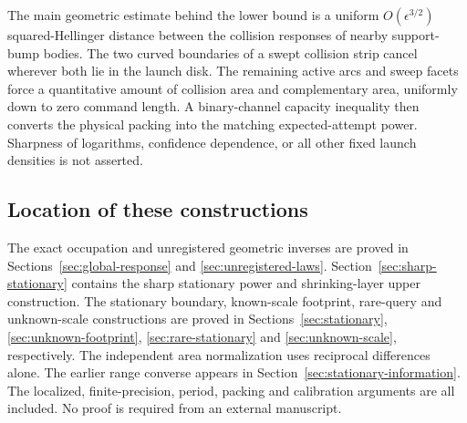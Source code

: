 The main geometric estimate behind the lower bound is a uniform
$O(\epsilon^{3/2})$ squared-Hellinger distance between the collision
responses of nearby support-bump bodies. The two curved boundaries
of a swept collision strip cancel wherever both lie in the launch
disk. The remaining active arcs and sweep facets force a quantitative
amount of collision area and complementary area, uniformly down to
zero command length. A binary-channel capacity inequality then converts
the physical packing into the matching expected-attempt power.
Sharpness of logarithms, confidence dependence, or all other fixed
launch densities is not asserted.

\subsection{Location of these constructions}
The exact occupation and unregistered geometric inverses are proved in
Sections~\ref{sec:global-response} and \ref{sec:unregistered-laws}.
Section~\ref{sec:sharp-stationary} contains the sharp stationary power
and shrinking-layer upper construction. The stationary boundary,
known-scale footprint, rare-query and unknown-scale constructions are
proved in Sections~\ref{sec:stationary}, \ref{sec:unknown-footprint},
\ref{sec:rare-stationary} and \ref{sec:unknown-scale}, respectively.
The independent area normalization uses reciprocal differences alone.
The earlier range converse appears in
Section~\ref{sec:stationary-information}. The localized,
finite-precision, period, packing and calibration arguments are all
included. No proof is required from an external manuscript.

